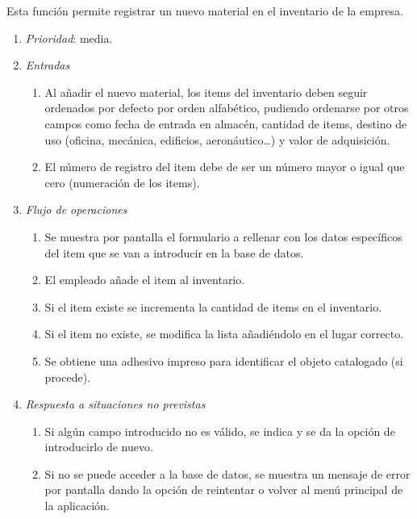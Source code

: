 

 \label{fun:EntrMat}
	Esta función permite registrar un nuevo material en el inventario de la empresa.

	\begin{enumerate}
		\item \textit{Prioridad}: media.
		\item \textit{Entradas}
		\begin{enumerate}
			\item Al añadir el nuevo material, los items del inventario deben seguir ordenados por defecto por orden alfabético, pudiendo ordenarse por otros campos como fecha de entrada en almacén, cantidad de items, destino de uso (oficina, mecánica, edificios, aeronáutico\ldots) y valor de adquisición.
			\item El número de registro del item debe de ser un número mayor o igual que cero (numeración de los items).
		\end{enumerate}
		\item \textit{Flujo de operaciones}
		\begin{enumerate}
			\item Se muestra por pantalla el formulario a rellenar con los datos específicos del item que se van a introducir en la base de datos.
			\item El empleado añade el item al inventario.
			\item Si el item existe se incrementa la cantidad de items en el inventario.
			\item Si el item no existe, se modifica la lista añadiéndolo en el lugar correcto.
			\item Se obtiene una adhesivo impreso para identificar el objeto catalogado (si procede).
		\end{enumerate}
		\item \textit{Respuesta a situaciones no previstas}
		\begin{enumerate}
			\item Si algún campo introducido no es válido, se indica y se da la opción de introducirlo de nuevo.
			\item Si no se puede acceder a la base de datos, se muestra un mensaje de error por pantalla dando la opción de reintentar o volver al menú principal de la aplicación.
		\end{enumerate}
	\end{enumerate}
